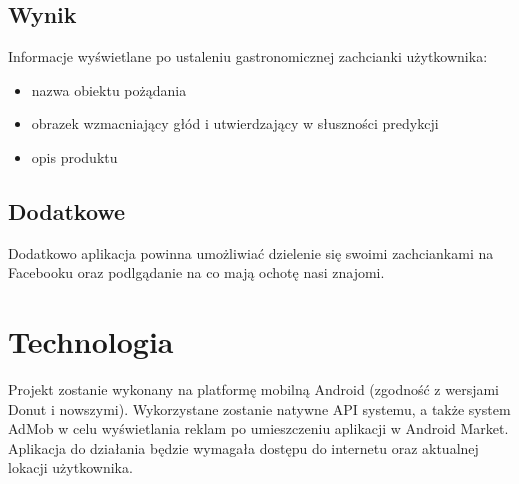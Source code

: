 \documentclass[a4paper,twoside,11pt]{article}
\begin{document}
\subsection{Wynik}
Informacje wyświetlane po ustaleniu gastronomicznej zachcianki użytkownika:
\begin{itemize}
\item nazwa obiektu pożądania
\item obrazek wzmacniający głód i utwierdzający w słuszności predykcji
\item opis produktu
\end{itemize}

\subsection{Dodatkowe}
Dodatkowo aplikacja powinna umożliwiać dzielenie się swoimi zachciankami na Facebooku oraz podlgądanie na co mają ochotę nasi znajomi.

\section{Technologia}
Projekt zostanie wykonany na platformę mobilną Android (zgodność z wersjami Donut i nowszymi). Wykorzystane zostanie natywne API systemu, a także system AdMob w celu wyświetlania reklam po umieszczeniu aplikacji w Android Market. Aplikacja do działania będzie wymagała dostępu do internetu oraz aktualnej lokacji użytkownika.
\end{document}
